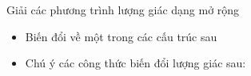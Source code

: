 \begin{dang}{Giải các phương trình lượng giác dạng mở rộng}
	\begin{itemize}
		\item [$\bullet$] Biến đổi về một trong các cấu trúc sau
		\item [$\bullet$] Chú ý các công thức biến đổi lượng giác sau:
	\end{itemize}
\end{dang}

